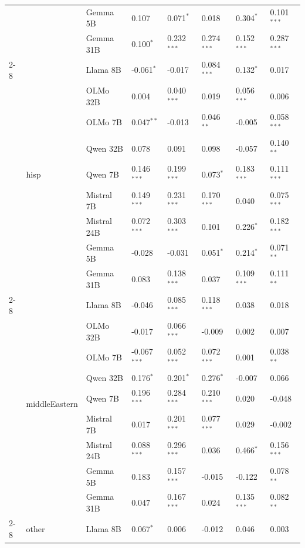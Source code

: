 \begin{longtable}[t]{llllllll}
 &  & Gemma 5B & 0.107 & 0.071$^{*}$ & 0.018 & 0.304$^{*}$ & 0.101$^{***}$ \\
 &  & Gemma 31B & 0.100$^{*}$ & 0.232$^{***}$ & 0.274$^{***}$ & 0.152$^{***}$ & 0.287$^{***}$ \\
\cline{2-8}
 & \multirow[t]{9}{*}{hisp} & Llama 8B & -0.061$^{*}$ & -0.017 & 0.084$^{***}$ & 0.132$^{*}$ & 0.017 \\
 &  & OLMo 32B & 0.004 & 0.040$^{***}$ & 0.019 & 0.056$^{***}$ & 0.006 \\
 &  & OLMo 7B & 0.047$^{**}$ & -0.013 & 0.046$^{**}$ & -0.005 & 0.058$^{***}$ \\
 &  & Qwen 32B & 0.078 & 0.091 & 0.098 & -0.057 & 0.140$^{**}$ \\
 &  & Qwen 7B & 0.146$^{***}$ & 0.199$^{***}$ & 0.073$^{*}$ & 0.183$^{***}$ & 0.111$^{***}$ \\
 &  & Mistral 7B & 0.149$^{***}$ & 0.231$^{***}$ & 0.170$^{***}$ & 0.040 & 0.075$^{***}$ \\
 &  & Mistral 24B & 0.072$^{***}$ & 0.303$^{***}$ & 0.101 & 0.226$^{*}$ & 0.182$^{***}$ \\
 &  & Gemma 5B & -0.028 & -0.031 & 0.051$^{*}$ & 0.214$^{*}$ & 0.071$^{**}$ \\
 &  & Gemma 31B & 0.083 & 0.138$^{***}$ & 0.037 & 0.109$^{***}$ & 0.111$^{**}$ \\
\cline{2-8}
 & \multirow[t]{9}{*}{middleEastern} & Llama 8B & -0.046 & 0.085$^{***}$ & 0.118$^{***}$ & 0.038 & 0.018 \\
 &  & OLMo 32B & -0.017 & 0.066$^{***}$ & -0.009 & 0.002 & 0.007 \\
 &  & OLMo 7B & -0.067$^{***}$ & 0.052$^{***}$ & 0.072$^{***}$ & 0.001 & 0.038$^{**}$ \\
 &  & Qwen 32B & 0.176$^{*}$ & 0.201$^{*}$ & 0.276$^{*}$ & -0.007 & 0.066 \\
 &  & Qwen 7B & 0.196$^{***}$ & 0.284$^{***}$ & 0.210$^{***}$ & 0.020 & -0.048 \\
 &  & Mistral 7B & 0.017 & 0.201$^{***}$ & 0.077$^{***}$ & 0.029 & -0.002 \\
 &  & Mistral 24B & 0.088$^{***}$ & 0.296$^{***}$ & 0.036 & 0.466$^{*}$ & 0.156$^{***}$ \\
 &  & Gemma 5B & 0.183 & 0.157$^{***}$ & -0.015 & -0.122 & 0.078$^{**}$ \\
 &  & Gemma 31B & 0.047 & 0.167$^{***}$ & 0.024 & 0.135$^{***}$ & 0.082$^{**}$ \\
\cline{2-8}
 & \multirow[t]{9}{*}{other} & Llama 8B & 0.067$^{*}$ & 0.006 & -0.012 & 0.046 & 0.003 \\

\end{longtable}
